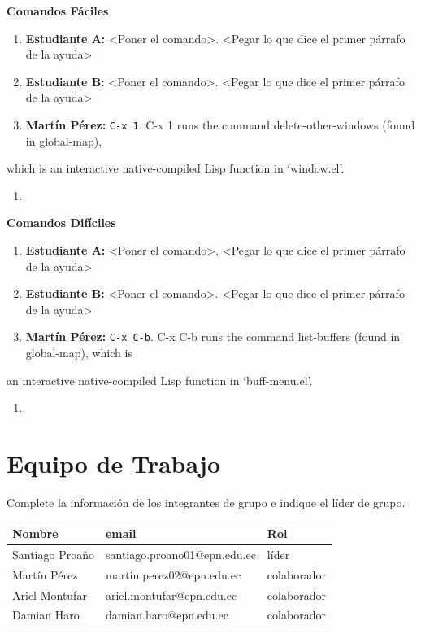 \documentclass{article}
\begin{document}
\textbf{\textbf{Comandos Fáciles}}
\begin{enumerate}
\item \textbf{\textbf{Estudiante A:}} <Poner el comando>. <Pegar lo que dice el primer párrafo de la ayuda>
\item \textbf{\textbf{Estudiante B:}} <Poner el comando>. <Pegar lo que dice el primer párrafo de la ayuda>
\item \textbf{\textbf{Martín Pérez:}} \texttt{C-x 1}. C-x 1 runs the command delete-other-windows (found in global-map),
\end{enumerate}
which is an interactive native-compiled Lisp function in ‘window.el’.
\begin{enumerate}
\item 
\end{enumerate}

\textbf{\textbf{Comandos Difíciles}}
\begin{enumerate}
\item \textbf{\textbf{Estudiante A:}} <Poner el comando>. <Pegar lo que dice el primer párrafo de la ayuda>
\item \textbf{\textbf{Estudiante B:}} <Poner el comando>. <Pegar lo que dice el primer párrafo de la ayuda>
\item \textbf{\textbf{Martín Pérez:}} \texttt{C-x C-b}. C-x C-b runs the command list-buffers (found in global-map), which is
\end{enumerate}
an interactive native-compiled Lisp function in ‘buff-menu.el’.
\begin{enumerate}
\item 
\end{enumerate}

\section{Equipo de Trabajo}
\label{sec:org0ea1fd4}
Complete la información de los integrantes de grupo e indique el líder
de grupo.

\begin{center}
\begin{tabular}{lll}
\hline
Nombre & email & Rol\\[0pt]
\hline
Santiago Proaño & santiago.proano01@epn.edu.ec & líder\\[0pt]
Martín Pérez & martin.perez02@epn.edu.ec & colaborador\\[0pt]
Ariel Montufar & ariel.montufar@epn.edu.ec & colaborador\\[0pt]
Damian Haro & damian.haro@epn.edu.ec & colaborador\\[0pt]
\hline
\end{tabular}
\end{center}
\end{document}
